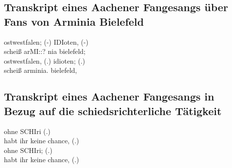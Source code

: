 \subsection{Transkript eines Aachener Fangesangs über Fans von Arminia Bielefeld}
\begin{dialogue}
	 ostwestfalen; (-) IDIoten, (-) \\
	scheiß arMI::? nia bielefeld; \\
	ostwestfalen, (.) idioten; (.) \\
	scheiß arminia. bielefeld,
\end{dialogue}

\subsection{Transkript eines Aachener Fangesangs in Bezug auf die schiedsrichterliche Tätigkeit}
\begin{dialogue}
	 ohne SCHIri (.) \\
	habt ihr keine chance, (.) \\
	ohne SCHIri; (.) \\
	habt ihr keine chance, (.)
\end{dialogue}

